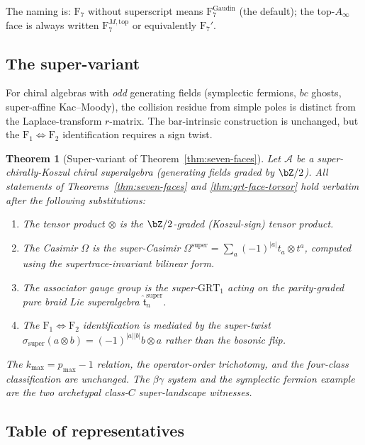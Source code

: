\documentclass[11pt]{article}
\theoremstyle{plain}
\newtheorem{theorem}{Theorem}[section]
\theoremstyle{definition}
\theoremstyle{remark}
\newcommand{\cA}{\mathcal{A}}
\begin{document}
The naming is: $\mathrm{F}_7$ without superscript means
$\mathrm{F}_7^{\mathrm{Gaudin}}$ (the default); the top-$A_\infty$
face is always written $\mathrm{F}_7^{M,\mathrm{top}}$ or
equivalently $\mathrm{F}_7'$.

\subsection{The super-variant}\label{sec:super-variant}

For chiral algebras with \emph{odd} generating fields (symplectic
fermions, $bc$ ghosts, super-affine Kac--Moody), the collision
residue from simple poles is distinct from the Laplace-transform
$r$-matrix. The bar-intrinsic construction is unchanged,
but the $\mathrm{F}_1\Leftrightarrow\mathrm{F}_2$ identification
requires a sign twist.

\begin{theorem}[Super-variant of
Theorem~\textup{\ref{thm:seven-faces}}]\label{thm:super-variant}
Let $\cA$ be a super-chirally-Koszul chiral superalgebra
(generating fields graded by $\bZ/2$). All statements of
Theorems~\textup{\ref{thm:seven-faces}} and
\textup{\ref{thm:grt-face-torsor}} hold verbatim after the following
substitutions:
\begin{enumerate}[label=\textup{(\alph*)}]
 \item The tensor product $\otimes$ is the $\bZ/2$-graded
 (Koszul-sign) tensor product.
 \item The Casimir $\Omega$ is the super-Casimir
 $\Omega^{\mathrm{super}} = \sum_a (-1)^{|a|}t_a\otimes t^a$,
 computed using the supertrace-invariant bilinear form.
 \item The associator gauge group is the super-$\mathrm{GRT}_1$
 acting on the parity-graded pure braid Lie superalgebra
 $\widehat{\mathfrak{t}}_n^{\mathrm{super}}$.
 \item The $\mathrm{F}_1\Leftrightarrow\mathrm{F}_2$ identification
 is mediated by the super-twist
 $\sigma_{\mathrm{super}}(a\otimes b) = (-1)^{|a||b|}b\otimes a$
 rather than the bosonic flip.
\end{enumerate}
The $k_{\max}=p_{\max}-1$ relation, the operator-order trichotomy,
and the four-class classification are unchanged. The
$\beta\gamma$ system and the symplectic fermion example are the
two archetypal class-$C$ super-landscape witnesses.
\end{theorem}

\subsection{Table of representatives}\label{tab:grt-representatives-sec}
\end{document}
